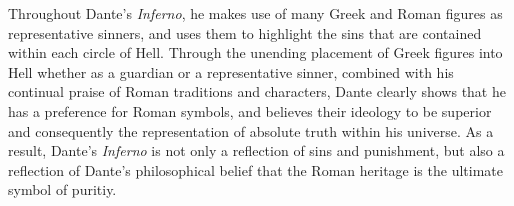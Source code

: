\documentclass[12pt]{article}
\begin{document}
	Throughout Dante's \textit{Inferno}, he makes use of many Greek and Roman figures as representative sinners, and uses them to 
	highlight the sins that are contained within each circle of Hell. Through the unending placement of Greek figures into 
	Hell whether as a guardian or a representative sinner, combined with his continual praise of Roman traditions and characters,
	Dante clearly shows that he has a preference for Roman symbols, and believes their ideology to be superior and consequently the 
	representation of absolute truth within his universe. As a result, Dante's \textit{Inferno} is not only a reflection of 
	sins and punishment, but also a reflection of Dante's philosophical belief that the Roman heritage is the ultimate 
	symbol of puritiy.
	\nocite{*}
    \printbibliography
\end{document}
